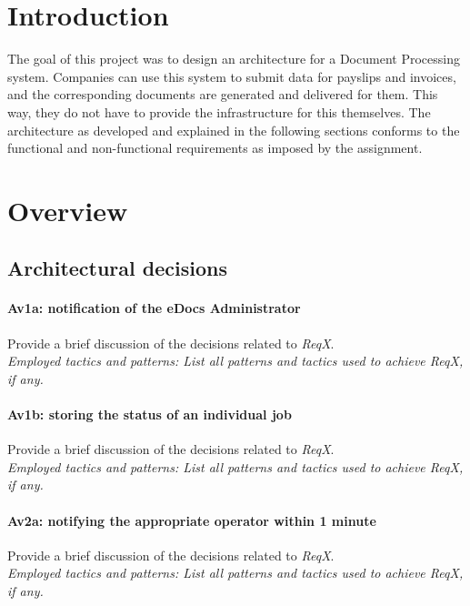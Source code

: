 \documentclass[a4paper,10pt]{article}
\begin{document}


\tableofcontents
\newpage

\section{Introduction}\label{sec:introduction}

The goal of this project was to design an architecture for a Document Processing system. Companies can use this system to submit data for payslips and invoices, and the corresponding documents are generated and delivered for them. This way, they do not have to provide the infrastructure for this themselves. The architecture as developed and explained in the following sections conforms to the functional and non-functional requirements as imposed by the assignment.

\section{Overview}\label{sec:overview}
\subsection{Architectural decisions}

\paragraph{Av1a\@: notification of the eDocs Administrator} Provide a brief discussion of the
decisions related to \emph{ReqX}.\\
\emph{Employed tactics and patterns: List all patterns and tactics used to
    achieve ReqX, if any.}
    
\paragraph{Av1b\@: storing the status of an individual job} Provide a brief discussion of the
decisions related to \emph{ReqX}.\\
\emph{Employed tactics and patterns: List all patterns and tactics used to
    achieve ReqX, if any.}
    
\paragraph{Av2a\@: notifying the appropriate operator within 1 minute} Provide a brief discussion of the decisions related to \emph{ReqX}.\\
\emph{Employed tactics and patterns: List all patterns and tactics used to
    achieve ReqX, if any.}
    
\end{document}
